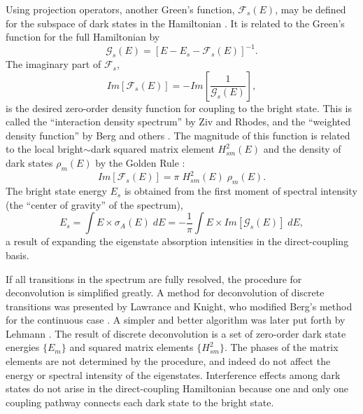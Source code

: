 Using projection operators, another Green's function,
$\mathcal{F}_s(E)$, may be defined for the subspace of dark states in
the Hamiltonian \cite{ziv76, cable80}.  It is related to the Green's
function for the full Hamiltonian by
\begin{equation}
  \label{eq:green-subspace}
  \mathcal{G}_s(E) = [E - E_s - \mathcal{F}_s(E)]^{-1}.
\end{equation}
The imaginary part of $\mathcal{F}_s$,
\begin{equation}
  \label{eq:idf}
  Im[\mathcal{F}_s(E)] = - Im \left [
    \frac{1}{\mathcal{G}_s(E)}
  \right ], 
\end{equation}
is the desired zero-order density function for coupling to the bright
state.  This is called the ``interaction density spectrum'' by Ziv and
Rhodes, and the ``weighted density function'' by Berg and others
\cite{ziv76, berg76}.  The magnitude of this function is related to
the local bright$\sim$dark squared matrix element $H_{sm}^2(E)$ and
the density of dark states $\rho_m(E)$ by the Golden Rule
\cite{berg76}:
\begin{equation}
  Im[\mathcal{F}_s(E)] = \pi \; H_{sm}^2(E) \; \rho_m(E).
\end{equation}
The bright state energy $E_s$ is obtained from the first moment of
spectral intensity (the ``center of gravity'' of the spectrum),
\begin{equation}
  \label{eq:bse-continuous}
  E_s = \int E \times \sigma_A (E) \; dE
  = - \frac{1}{\pi} \int E \times Im[\mathcal{G}_s(E)] \; dE,
\end{equation}
a result of expanding the eigenstate absorption intensities in the
direct-coupling basis.


If all transitions in the spectrum are fully resolved, the procedure
for deconvolution is simplified greatly.  A method for deconvolution
of discrete transitions was presented by Lawrance and Knight, who
modified Berg's method for the continuous case \cite{lawrance85,
  berg76}.  A simpler and better algorithm was later put forth by
Lehmann \cite{lehmann91}.  The result of discrete deconvolution is a
set of zero-order dark state energies $\lbrace E_m \rbrace$ and
squared matrix elements $\lbrace H_{sm}^2 \rbrace$.  The phases of the
matrix elements are not determined by the procedure, and indeed do not
affect the energy or spectral intensity of the eigenstates.
Interference effects among dark states do not arise in the
direct-coupling Hamiltonian because one and only one coupling pathway
connects each dark state to the bright state.

